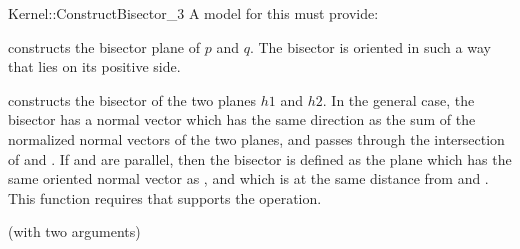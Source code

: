 \begin{ccRefFunctionObjectConcept}{Kernel::ConstructBisector_3}
A model for this must provide:


{constructs the bisector plane of $p$ and $q$.
The bisector is oriented in such a way that  lies on its
positive side. }

{constructs the bisector of the two planes $h1$ and $h2$.
In the general case, the bisector has a normal vector which has the same
direction as the sum of the normalized normal vectors of the two planes, and
passes through the intersection of  and .
If  and  are parallel, then the bisector is defined as the
plane which has the same oriented normal vector as , and which is at
the same distance from  and .
This function requires that  supports the 
operation.}

\ccRefines
{} (with two arguments)

\ccSeeAlso
{}

\end{ccRefFunctionObjectConcept}

